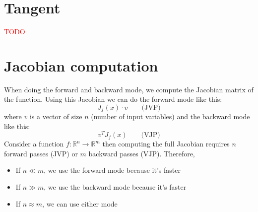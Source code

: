 \documentclass[12pt, openany]{report}
\newcommand{\R}{\mathbb{R}}
\theoremstyle{definition}
\begin{document}
\section{Tangent}
\textcolor{red}{TODO}
\section{Jacobian computation}
When doing the forward and backward mode, we compute the Jacobian matrix of the function. 
Using this Jacobian we can do the forward mode like this:
\begin{equation}
  J_f(x) \cdot v \quad \quad \text{(JVP)}
\end{equation}
where $v$ is a vector of size $n$ (number of input variables)
and the backward mode like this:
\begin{equation}
  v^T J_f(x) \quad \quad \text{(VJP)}
\end{equation}
Consider a function $f:\R^n \rightarrow \R^m$ then computing the full Jacobian requires $n$ forward passes (JVP) or $m$ backward passes (VJP). Therefore,
\begin{itemize}
  \item If $n \ll m$, we use the forward mode because it's faster
  \item If $n \gg m$, we use the backward mode because it's faster
  \item If $n \approx m$, we can use either mode
\end{itemize}
\end{document}
